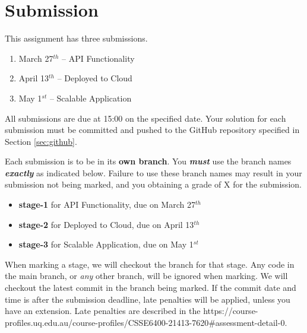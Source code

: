 \documentclass{csse4400}
\begin{document}


\section{Submission}
This assignment has three submissions.

\begin{enumerate}[topsep=5pt,partopsep=2pt,itemsep=3pt,parsep=4pt]
  \item March 27$^{th}$ -- API Functionality
  \item April 13$^{th}$ -- Deployed to Cloud
  \item May 1$^{st}$ -- Scalable Application
\end{enumerate}
All submissions are due at 15:00 on the specified date.
Your solution for each submission must be committed and pushed to the GitHub repository specified in Section \ref{sec:github}.

Each submission is to be in its \textbf{own branch}.
You \textbf{\textit{must}} use the branch names \textbf{\textit{exactly}} as indicated below.
Failure to use these branch names may result in your submission not being marked,
and you obtaining a grade of X for the submission.
\begin{itemize}[topsep=6pt,partopsep=2pt,itemsep=3pt,parsep=4pt]
  \item \textbf{stage-1} for API Functionality, due on March 27$^{th}$
  \item \textbf{stage-2} for Deployed to Cloud, due on April 13$^{th}$
  \item \textbf{stage-3} for Scalable Application, due on May 1$^{st}$
\end{itemize}

When marking a stage, we will checkout the branch for that stage.
Any code in the main branch, or \textit{any} other branch, will be ignored when marking.
We will checkout the latest commit in the branch being marked.
If the commit date and time is after the submission deadline, late penalties will be applied,
unless you have an extension.
Late penalties are described in the 
{https://course-profiles.uq.edu.au/course-profiles/CSSE6400-21413-7620\#assessment-detail-0}.
\end{document}
